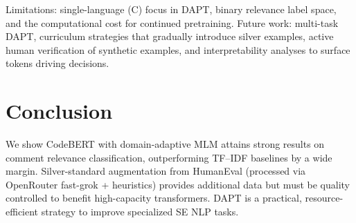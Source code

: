 \documentclass[runningheads]{ceurart}
\begin{document}
Limitations: single-language (C) focus in DAPT, binary relevance label space, and the computational cost for continued pretraining. Future work: multi-task DAPT, curriculum strategies that gradually introduce silver examples, active human verification of synthetic examples, and interpretability analyses to surface tokens driving decisions.

\section{Conclusion}
We show CodeBERT with domain-adaptive MLM attains strong results on comment relevance classification, outperforming TF--IDF baselines by a wide margin. Silver-standard augmentation from HumanEval (processed via OpenRouter fast-grok + heuristics) provides additional data but must be quality controlled to benefit high-capacity transformers. DAPT is a practical, resource-efficient strategy to improve specialized SE NLP tasks.
\end{document}
